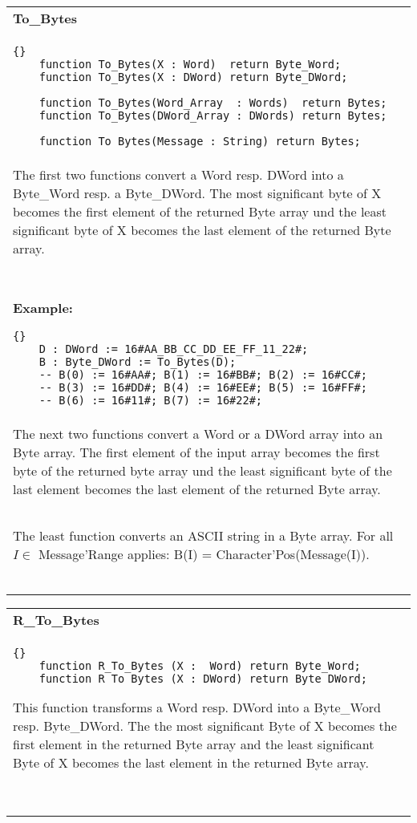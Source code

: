\begin{tabular}{p{\textwidth}}   
  \textbf{To\_Bytes}\ \\
  \begin{lstlisting}{}
    function To_Bytes(X : Word)  return Byte_Word;
    function To_Bytes(X : DWord) return Byte_DWord; 

    function To_Bytes(Word_Array  : Words)  return Bytes;
    function To_Bytes(DWord_Array : DWords) return Bytes;

    function To_Bytes(Message : String) return Bytes;
  \end{lstlisting}\\
  The first two functions convert a Word resp. DWord into a Byte\_Word resp.
  a Byte\_DWord.
  The most significant byte of X becomes the first element of the returned
  Byte array und the least significant byte of X becomes the last element of 
  the returned  Byte array.\\ \ \\
  \textbf{Example:}
  \begin{lstlisting}{}
    D : DWord := 16#AA_BB_CC_DD_EE_FF_11_22#;
    B : Byte_DWord := To_Bytes(D);
    -- B(0) := 16#AA#; B(1) := 16#BB#; B(2) := 16#CC#;
    -- B(3) := 16#DD#; B(4) := 16#EE#; B(5) := 16#FF#; 
    -- B(6) := 16#11#; B(7) := 16#22#;
  \end{lstlisting}\\
  The next two functions convert a Word or a DWord array into an Byte array.
  The first element of the input array becomes the first byte of the 
  returned byte array und the least significant byte of the last element 
  becomes the last element of the returned  Byte array.\\ \ \\
  The least function converts an ASCII string in a Byte array.
  For all $I \in$ Message'Range applies:
  B(I) =  Character'Pos(Message(I)).\\  \ \\
\hline\\
\end{tabular}



\begin{tabular}{p{\textwidth}}
  \textbf{R\_To\_Bytes}\ \\
  \begin{lstlisting}{}
    function R_To_Bytes (X :  Word) return Byte_Word; 
    function R_To_Bytes (X : DWord) return Byte_DWord;
  \end{lstlisting}
  This function transforms a Word resp. DWord into a Byte\_Word
  resp. Byte\_DWord.
  The the most significant Byte of X becomes the first element in the returned
  Byte array and the least  significant Byte of X becomes the last element in 
  the returned Byte array.\\ \ \\
  \hline\\
\end{tabular}

